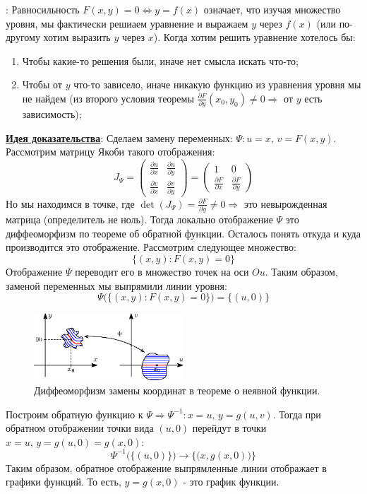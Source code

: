 \documentclass[12pt]{article}
\theoremstyle{definition}
\begin{document}
\textbf{}: Равносильность $F(x,y) = 0 \Leftrightarrow y = f(x)$ означает, что изучая множество уровня, мы фактически решиаем уравнение и выражаем $y$ через $f(x)$ (или по-другому хотим выразить $y$ через $x$). Когда  хотим решить уравнение хотелось бы:
\begin{enumerate}[label ={\arabic*)}]
	\item Чтобы какие-то решения были, иначе нет смысла искать что-то;
	\item Чтобы от $y$ что-то зависело, иначе никакую функцию из уравнения уровня мы не найдем \big(из второго условия теоремы $\tfrac{\partial F}{\partial y}(x_0,y_0) \neq 0 \Rightarrow$ от $y$ есть зависимость\big);
\end{enumerate} 

\textbf{\uline{Идея доказательства}}: Сделаем замену переменных: $\Psi \colon u = x, \, v = F(x,y)$. Рассмотрим матрицу Якоби такого отображения:
$$	
	J_\Psi = 
	\begin{pmatrix}
		\tfrac{\partial u}{\partial x} & \tfrac{\partial u}{\partial y}\\
		\tfrac{\partial v}{\partial x} & \tfrac{\partial v}{\partial y}
	\end{pmatrix} =
	\begin{pmatrix}
		1 & 0 \\
		\tfrac{\partial F}{\partial x} & \tfrac{\partial F}{\partial y}
	\end{pmatrix}
$$
Но мы находимся в точке, где $\det{(J_\Psi)} = \tfrac{\partial F}{\partial y} \neq 0 \Rightarrow$ это невырожденная матрица (определитель не ноль). Тогда локально отображение $\Psi$ это диффеоморфизм по теореме об обратной функции. Осталось понять откуда и куда производится это отображение. Рассмотрим следующее множество:
$$
	\{(x,y) \colon F(x,y) = 0 \}
$$
Отображение $\Psi$ переводит его в множество точек на оси $Ou$. Таким образом, заменой переменных мы выпрямили линии уровня:
$$
	\Psi\big(\{(x,y) \colon F(x,y) = 0 \} \big) = \{(u,0)\}
$$
\begin{figure}[H]
	\centering
	\includegraphics[width=0.5\textwidth]{15_7.eps}
	\caption{Диффеоморфизм замены координат в теореме о неявной функции.}
	\label{15_7}
\end{figure}
Построим обратную функцию к $\Psi \Rightarrow \Psi^{-1} \colon x = u, \, y = g(u,v)$. Тогда при обратном отображении точки вида $(u,0)$ перейдут в точки $x = u, \, y = g(u,0) = g(x,0)$:
$$
	\Psi^{-1}\big(\{(u,0) \} \big) \to \big\{\big(x, g(x,0)\big) \big\}
$$
Таким образом, обратное отображение выпрямленные линии отображает в графики функций.
То есть, $y = g(x,0)$ - это график функции.
\end{document}
